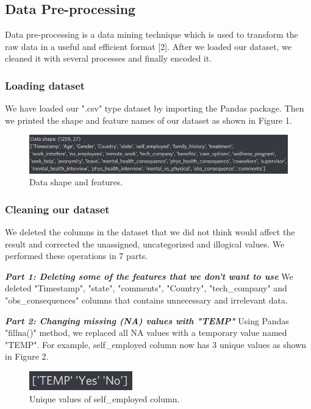 \documentclass[onecolumn]{article}
\begin{document}
\subsection{Data Pre-processing}
Data pre-processing is a data mining technique which is used to transform the raw data in a useful and efficient format [2]. After we loaded our dataset, we cleaned it with several processes and finally encoded it.

\subsubsection{Loading dataset}
We have loaded our ".csv" type dataset by importing the Pandas package. Then we printed the shape and feature names of our dataset as shown in Figure 1.

\begin{figure}[h]
\centering
    \includegraphics[width=.8\linewidth]{fig/fig1.png}
\caption{\label{figure1}
Data shape and features.}
\end{figure}

\subsubsection{Cleaning our dataset}
We deleted the columns in the dataset that we did not think would affect the result and corrected the unassigned, uncategorized and illogical values. We performed these operations in 7 parts.\bigbreak

\textbf{\emph{Part 1: Deleting some of the features that we don't want to use}}\bigbreak
We deleted "Timestamp", "state", "comments", "Country", "{tech\_company}" and "{obs\_consequences}" columns that contains unnecessary and irrelevant data.\bigbreak

\textbf{\emph{Part 2: Changing missing (NA) values with "TEMP"}}\bigbreak
Using Pandas "fillna()" method, we replaced all NA values with a temporary value named "{TEMP}". For  example, self\_employed column now has 3 unique values as shown in Figure 2.\bigbreak

\begin{figure}[h]
\centering
    \includegraphics[width=.4\linewidth]{fig/fig2.png}
\caption{\label{figure2}
Unique values of self\_employed column.}
\end{figure}
\end{document}
